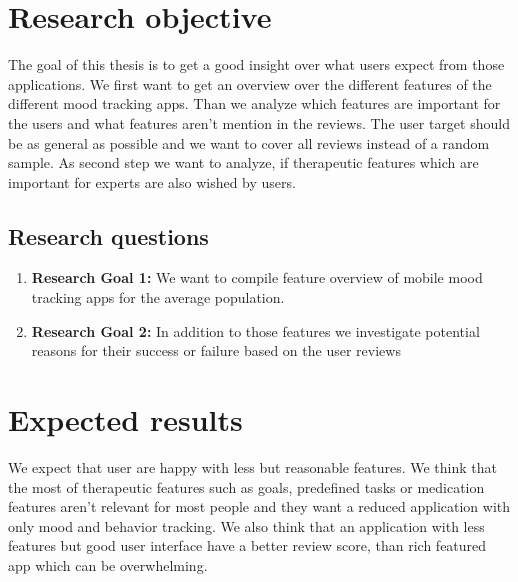 \section{Research objective}
\label{sec:research-objective}
The goal of this thesis is to get a good insight over what users expect from those applications.
We first want to get an overview over the different features of the different mood tracking apps.
Than we analyze which features are important for the users and what features aren't mention in the reviews.
The user target should be as general as possible and we want to cover all reviews instead of a random sample.
As second step we want to analyze, if therapeutic features which are important for experts are also wished by users.
\subsection{Research questions}
\label{sec:research-questions}
\begin{enumerate}
\item \textbf{Research Goal 1:}
We want to compile feature overview of mobile mood tracking
apps for the average population.
\item \textbf{Research Goal 2:} In addition to those features we investigate potential reasons
for their success or failure based on the user reviews
\end{enumerate}


\section{Expected results}
\label{sec:expected-results}
We expect that user are happy with less but reasonable features.
We think that the most of therapeutic features such as goals, 
predefined tasks or medication features aren't relevant for most people and they want 
a reduced application with only mood and behavior tracking.
We also think that an application with less features but good user interface have a better review score, than rich featured app which can be overwhelming.



